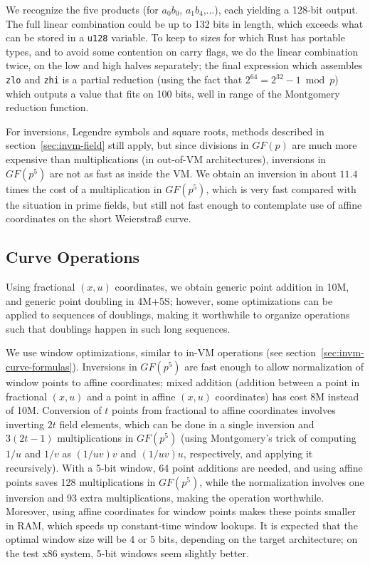 \documentclass{llncs}
\newcommand{\GF}{GF}
\begin{document}
We recognize the five products (for $a_0 b_0$, $a_1 b_4$,...), each
yielding a 128-bit output. The full linear combination could be up to
132 bits in length, which exceeds what can be stored in a \verb+u128+
variable. To keep to sizes for which Rust has portable types, and to
avoid some contention on carry flags, we do the linear combination
twice, on the low and high halves separately; the final expression which
assembles \verb+zlo+ and \verb+zhi+ is a partial reduction (using the
fact that $2^{64} = 2^{32} - 1 \bmod p$) which outputs a value that fits
on 100 bits, well in range of the Montgomery reduction function.

For inversions, Legendre symbols and square roots, methods described
in section~\ref{sec:invm-field} still apply, but since divisions in
$\GF(p)$ are much more expensive than multiplications (in out-of-VM
architectures), inversions in $\GF(p^5)$ are not as fast as inside the
VM. We obtain an inversion in about $11.4$ times the cost of a
multiplication in $\GF(p^5)$, which is very fast compared with the
situation in prime fields, but still not fast enough to contemplate
use of affine coordinates on the short Weierstraß curve.

\subsection{Curve Operations}

Using fractional $(x, u)$ coordinates, we obtain generic point
addition in 10M, and generic point doubling in 4M+5S; however, some
optimizations can be applied to sequences of doublings, making it
worthwhile to organize operations such that doublings happen in such
long sequences.

We use window optimizations, similar to in-VM operations (see
section~\ref{sec:invm-curve-formulas}). Inversions in $\GF(p^5)$ are
fast enough to allow normalization of window points to affine
coordinates; mixed addition (addition between a point in fractional $(x,
u)$ and a point in affine $(x, u)$ coordinates) has cost 8M instead of
10M. Conversion of $t$ points from fractional to affine coordinates
involves inverting $2t$ field elements, which can be done in a single
inversion and $3(2t-1)$ multiplications in $\GF(p^5)$ (using
Montgomery's trick of computing $1/u$ and $1/v$ as $(1/uv)v$ and
$(1/uv)u$, respectively, and applying it recursively). With a 5-bit
window, 64 point additions are needed, and using affine points saves 128
multiplications in $\GF(p^5)$, while the normalization involves one
inversion and 93 extra multiplications, making the operation worthwhile.
Moreover, using affine coordinates for window points makes these points
smaller in RAM, which speeds up constant-time window lookups. It is
expected that the optimal window size will be 4 or 5 bits, depending
on the target architecture; on the test x86 system, 5-bit windows seem
slightly better.
\end{document}
